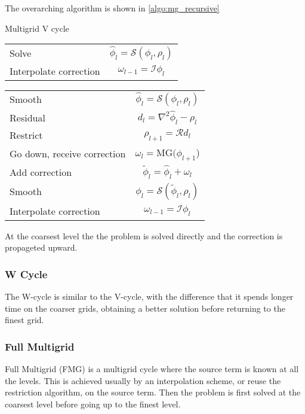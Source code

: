 		The overarching algorithm is shown in \cref{algo:mg_recursive}
		\begin{algorithm}
			\caption{Multigrid V cycle}
	        \begin{algorithmic}
				\State
				\begin{tabular}	{l | c}
					Solve &\( \widehat{\phi}_l = \mathcal{S}(\phi_l, \rho_l)\)
					\\
					Interpolate correction &\( \omega_{l-1} = \mathcal{I} \phi_l\)
				\end{tabular}
				\Else
					\State
					\begin{tabular}	{l | c}
						Smooth &\( \widehat{\phi}_l = \mathcal{S}(\phi_l, \rho_l)\)
						\\
						Residual &	\(d_l = \nabla^2\widehat{\phi}_l - \rho_l\)
						\\
						Restrict &\(\rho_{l+1} = \mathcal{R}d_l \) \nonumber
						\\
						Go down, receive correction & \(\omega_l = \text{MG}( \phi_{l+1}\))
						\\
						Add correction	&\(\widetilde{\phi}_l = \widehat{\phi}_l + \omega_l\)
						\\
						Smooth	&\(\phi_l = \mathcal{S}(\widetilde{\phi}_l, \rho_l)\)
						\\
						Interpolate correction &\( \omega_{l-1} = \mathcal{I} \phi_l\)
					\end{tabular}
	            \EndFor
				\EndIf
	        \end{algorithmic}
			\label{algo:mg_recursive}
	    \end{algorithm}

		At the coarsest level the the problem is solved directly and the correction is propageted upward.

	\subsubsection{W Cycle}
		The W-cycle is similar to the V-cycle, with the difference that it spends longer time on the coarser grids,
		obtaining a better solution before returning to the finest grid.

	\subsubsection{Full Multigrid}
		Full Multigrid (FMG) is a multigrid cycle where the source term is known at all the levels.
		This is achieved usually by an interpolation scheme, or reuse the restriction algorithm,
		on the source term. Then the problem is first solved at the coarsest level before going up to the finest level.

